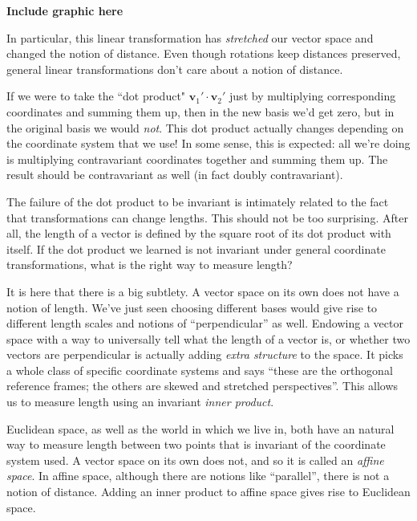 	\textbf{Include graphic here}
	
	In particular, this linear transformation has \emph{stretched} our vector space and changed the notion of distance. Even though rotations keep distances preserved, general linear transformations don't care about a notion of distance. 
	
	If we were to take the ``dot product" $\mathbf v_1' \cdot \mathbf v_2'$ just by multiplying corresponding coordinates and summing them up, then in the new basis we'd get zero, but in the original basis we would \emph{not}. This dot product actually changes depending on the coordinate system that we use! In some sense, this is expected: all we're doing is multiplying contravariant coordinates together and summing them up. The result should be contravariant as well (in fact doubly contravariant).
	
	
	The failure of the dot product to be invariant is intimately related to the fact that transformations can change lengths. This should not be too surprising. After all, the length of a vector is defined by the square root of its dot product with itself. If the dot product we learned is not invariant under general coordinate transformations, what is the right way to measure length? 
	
	It is here that there is a big subtlety. A vector space on its own does not have a notion of length. We've just seen choosing different bases would give rise to different length scales and notions of ``perpendicular'' as well. Endowing a vector space with a way to universally tell what the length of a vector is, or whether two vectors are perpendicular is actually adding \emph{extra structure} to the space. It picks a whole class of specific coordinate systems and says ``these are the orthogonal reference frames; the others are skewed and stretched perspectives''. This allows us to measure length using an invariant \emph{inner product}. 
	
	Euclidean space, as well as the world in which we live in, both have an natural way to measure length between two points that is invariant of the coordinate system used. A vector space on its own does not, and so it is called an \emph{affine space}. In affine space, although there are notions like ``parallel'', there is not a notion of distance. Adding an inner product to affine space gives rise to Euclidean space.
	
